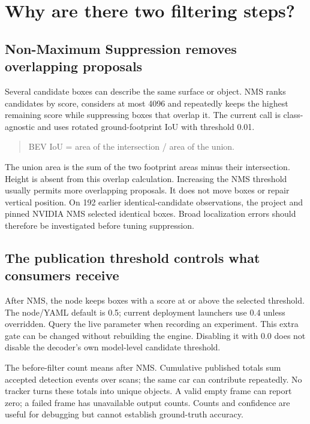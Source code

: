 \documentclass[11pt,a4paper]{article}
\begin{document}
\section{Why are there two filtering steps?}
\subsection{Non-Maximum Suppression removes overlapping proposals}
Several candidate boxes can describe the same surface or object. NMS ranks
candidates by score, considers at most 4096 and repeatedly keeps the highest
remaining score while suppressing boxes that overlap it. The current call is
class-agnostic and uses rotated ground-footprint IoU with threshold 0.01.
\begin{quote}
BEV IoU = area of the intersection / area of the union.
\end{quote}
The union area is the sum of the two footprint areas minus their intersection.
Height is absent from this overlap calculation. Increasing the NMS threshold
usually permits more overlapping proposals. It does not move boxes or repair
vertical position. On 192 earlier identical-candidate observations, the project
and pinned NVIDIA NMS selected identical boxes. Broad localization errors should
therefore be investigated before tuning suppression.

\subsection{The publication threshold controls what consumers receive}
After NMS, the node keeps boxes with a score at or above the selected threshold. The node/YAML default is 0.5;
current deployment launchers use 0.4 unless overridden. Query the live parameter
when recording an experiment. This extra gate can be changed without rebuilding
the engine. Disabling it with 0.0 does not disable the decoder's own model-level
candidate threshold.

\begin{center}
\end{center}
The before-filter count means after NMS. Cumulative published totals sum accepted
detection events over scans; the same car can contribute repeatedly. No tracker
turns these totals into unique objects. A valid empty frame can report zero;
a failed frame has unavailable output counts. Counts and confidence are useful
for debugging but cannot establish ground-truth accuracy.
\end{document}
